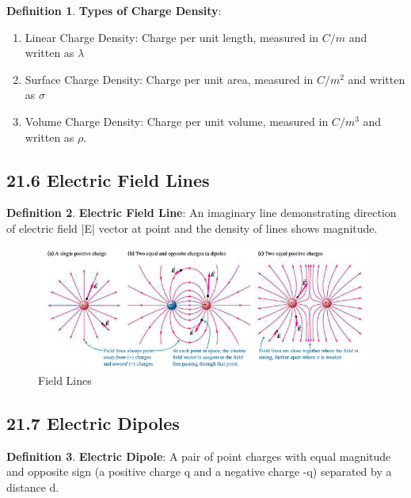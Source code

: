 \documentclass[12pt]{amsart}
\theoremstyle{definition}
\newtheorem{definition}{Definition} %
\numberwithin{equation}{theorem}    %
\begin{document}
\begin{definition}
    \textbf{Types of Charge Density}: 
    \begin{enumerate}
        \item Linear Charge Density: Charge per unit length, measured in $C/m$
        and written as $\lambda$
        \item Surface Charge Density: Charge per unit area, measured in $C/m^2$ 
        and written as $\sigma$
        \item Volume Charge Density: Charge per unit volume, measured in 
        $C/m^3$ and written as $\rho$.
    \end{enumerate}
\end{definition}

\subsection*{21.6 Electric Field Lines}
\begin{definition}
    \textbf{Electric Field Line}: An imaginary line demonstrating direction of 
    electric field |E| vector at point and the density of lines shows magnitude.
\end{definition}

\begin{figure}[H]
    \centering
    \includegraphics[width=5in]{Media/Fieldline.png}
    \caption{Field Lines}
    \label{Field Lines}
\end{figure}

\subsection*{21.7 Electric Dipoles}

\begin{definition}
    \textbf{Electric Dipole}: A pair of point charges with equal magnitude and 
    opposite sign (a positive charge q and a negative charge -q) separated by a
     distance d.
\end{definition}
\end{document}
